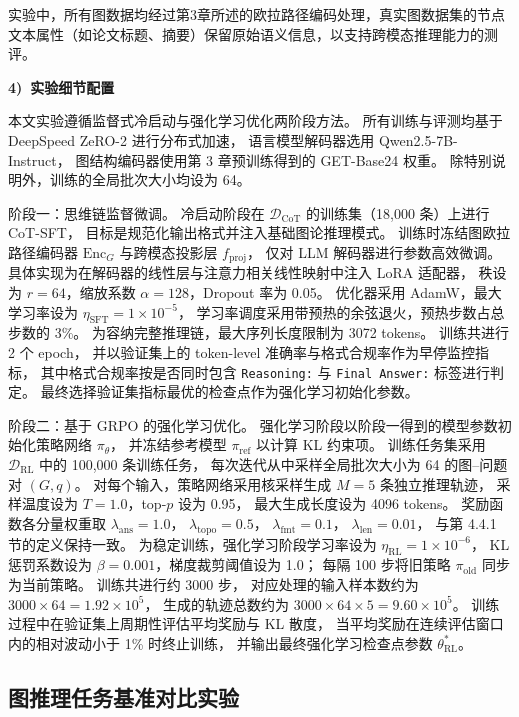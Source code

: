 实验中，所有图数据均经过第3章所述的欧拉路径编码处理，真实图数据集的节点文本属性（如论文标题、摘要）保留原始语义信息，以支持跨模态推理能力的测评。

\textbf{4)\ 实验细节配置}

本文实验遵循监督式冷启动与强化学习优化两阶段方法。
所有训练与评测均基于 DeepSpeed ZeRO-2 进行分布式加速，
语言模型解码器选用 Qwen2.5-7B-Instruct\cite{Yang2024Qwen25TR}，
图结构编码器使用第 3 章预训练得到的 GET-Base24 权重。
除特别说明外，训练的全局批次大小均设为 64。

{阶段一：思维链监督微调。}
冷启动阶段在 $\mathcal{D}_{\mathrm{CoT}}$ 的训练集（18,000 条）上进行 CoT-SFT，
目标是规范化输出格式并注入基础图论推理模式。
训练时冻结图欧拉路径编码器 $\mathrm{Enc}_G$ 与跨模态投影层 $f_{\mathrm{proj}}$，
仅对 LLM 解码器进行参数高效微调。
具体实现为在解码器的线性层与注意力相关线性映射中注入 LoRA 适配器，
秩设为 $r=64$，缩放系数 $\alpha=128$，Dropout 率为 0.05。
优化器采用 AdamW，最大学习率设为 $\eta_{\mathrm{SFT}}=1\times10^{-5}$，
学习率调度采用带预热的余弦退火，预热步数占总步数的 3\%。
为容纳完整推理链，最大序列长度限制为 3072 tokens。
训练共进行 2 个 epoch，
并以验证集上的 token-level 准确率与格式合规率作为早停监控指标，
其中格式合规率按是否同时包含 \texttt{Reasoning:} 与 \texttt{Final Answer:} 标签进行判定。
最终选择验证集指标最优的检查点作为强化学习初始化参数。

{阶段二：基于 GRPO 的强化学习优化。}
强化学习阶段以阶段一得到的模型参数初始化策略网络 $\pi_{\theta}$，
并冻结参考模型 $\pi_{\mathrm{ref}}$ 以计算 KL 约束项。
训练任务集采用 $\mathcal{D}_{\mathrm{RL}}$ 中的 100,000 条训练任务，
每次迭代从中采样全局批次大小为 64 的图--问题对 $(G,q)$。
对每个输入，策略网络采用核采样生成 $M=5$ 条独立推理轨迹，
采样温度设为 $T=1.0$，top-$p$ 设为 0.95，
最大生成长度设为 4096 tokens。
奖励函数各分量权重取
$\lambda_{\mathrm{ans}}=1.0$，
$\lambda_{\mathrm{topo}}=0.5$，
$\lambda_{\mathrm{fmt}}=0.1$，
$\lambda_{\mathrm{len}}=0.01$，
与第 4.4.1 节的定义保持一致。
为稳定训练，强化学习阶段学习率设为 $\eta_{\mathrm{RL}}=1\times10^{-6}$，
KL 惩罚系数设为 $\beta=0.001$，梯度裁剪阈值设为 1.0；
每隔 100 步将旧策略 $\pi_{\mathrm{old}}$ 同步为当前策略。
训练共进行约 3000 步，
对应处理的输入样本数约为 $3000\times64=1.92\times10^{5}$，
生成的轨迹总数约为 $3000\times64\times5=9.60\times10^{5}$。
训练过程中在验证集上周期性评估平均奖励与 KL 散度，
当平均奖励在连续评估窗口内的相对波动小于 1\% 时终止训练，
并输出最终强化学习检查点参数 $\theta_{\mathrm{RL}}^\ast$。

\subsection{图推理任务基准对比实验}

